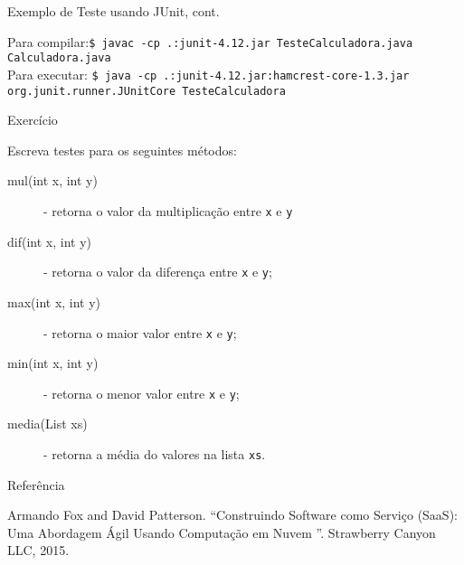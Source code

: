 \begin{frame}[fragile]{Exemplo de Teste usando JUnit, cont.}



\tiny
Para compilar:{\tt \$ javac -cp .:junit-4.12.jar TesteCalculadora.java Calculadora.java}\\
Para executar: {\tt \$ java -cp .:junit-4.12.jar:hamcrest-core-1.3.jar org.junit.runner.JUnitCore TesteCalculadora}
\end{frame}


\begin{frame}{Exercício}

  Escreva testes para os seguintes métodos:
  \begin{description}
  \item[mul(int x, int y)] - retorna o valor da multiplicação entre {\tt x} e {\tt y}
  \item[dif(int x, int y)] - retorna o valor da diferença entre {\tt x} e {\tt y};  
  \item[max(int x, int y)] - retorna o maior valor entre {\tt x} e {\tt y};
  \item[min(int x, int y)] - retorna o menor valor entre {\tt x} e {\tt y};
  \item[media(List xs)] - retorna a média do valores na lista {\tt xs}.
  \end{description}
  
\end{frame}

\begin{frame}{Referência}
  \begin{thebibliography}{10}
    \beamertemplatebookbibitems
    Armando Fox and David Patterson.
    \newblock ``Construindo Software como Serviço (SaaS): Uma Abordagem Ágil Usando Computação em Nuvem ''.
  \newblock Strawberry Canyon LLC, 2015.
  \end{thebibliography}
\end{frame}